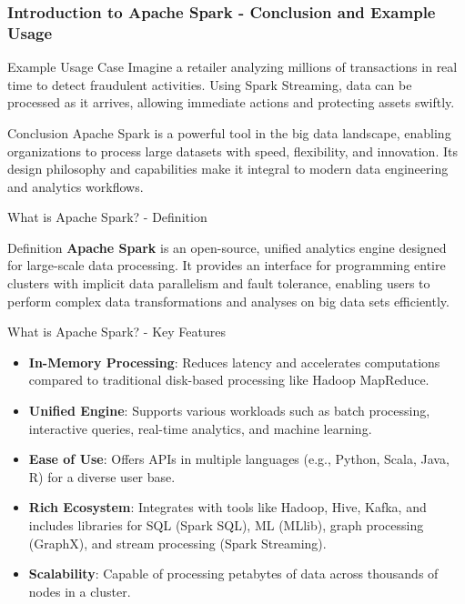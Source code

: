 \documentclass[aspectratio=169]{beamer}
\begin{document}
\begin{frame}[fragile]
    \frametitle{Introduction to Apache Spark - Conclusion and Example Usage}
    \begin{block}{Example Usage Case}
        Imagine a retailer analyzing millions of transactions in real time to detect fraudulent activities. 
        Using Spark Streaming, data can be processed as it arrives, allowing immediate actions and protecting assets swiftly.
    \end{block}
    
    \begin{block}{Conclusion}
        Apache Spark is a powerful tool in the big data landscape, enabling organizations to process large datasets with speed, flexibility, and innovation.
        Its design philosophy and capabilities make it integral to modern data engineering and analytics workflows.
    \end{block}
\end{frame}

\begin{frame}[fragile]{What is Apache Spark? - Definition}
    \begin{block}{Definition}
        \textbf{Apache Spark} is an open-source, unified analytics engine designed for large-scale data processing. It provides an interface for programming entire clusters with implicit data parallelism and fault tolerance, enabling users to perform complex data transformations and analyses on big data sets efficiently.
    \end{block}
\end{frame}

\begin{frame}[fragile]{What is Apache Spark? - Key Features}
    \begin{itemize}
        \item \textbf{In-Memory Processing}: Reduces latency and accelerates computations compared to traditional disk-based processing like Hadoop MapReduce.
        
        \item \textbf{Unified Engine}: Supports various workloads such as batch processing, interactive queries, real-time analytics, and machine learning.
        
        \item \textbf{Ease of Use}: Offers APIs in multiple languages (e.g., Python, Scala, Java, R) for a diverse user base.
        
        \item \textbf{Rich Ecosystem}: Integrates with tools like Hadoop, Hive, Kafka, and includes libraries for SQL (Spark SQL), ML (MLlib), graph processing (GraphX), and stream processing (Spark Streaming).
        
        \item \textbf{Scalability}: Capable of processing petabytes of data across thousands of nodes in a cluster.
    \end{itemize}
\end{frame}
\end{document}
